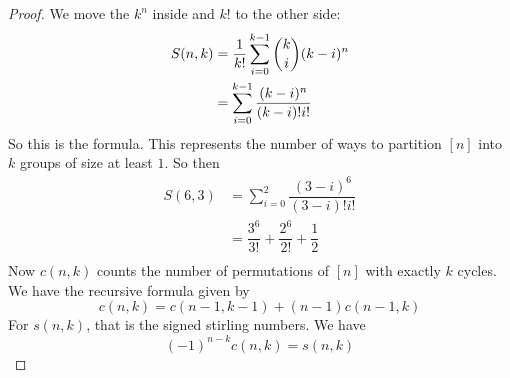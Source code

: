 \documentclass{article}
\begin{document}
\begin{proof}
        We move the $k^{n}$ inside and $k!$ to the other side:
            \begin{align*}
                S(n, k) &= \dfrac{1}{k!}\sum_{i = 0}^{k - 1}\dbinom{k}{i}(k - i)^{n} \\
                        &= \sum_{i = 0}^{k - 1}\dfrac{(k - i)^{n}}{(k - i)!i!}         
            \end{align*}
        So this is the formula. This represents the number of ways to partition $[n]$ into $k$ groups of size at least $1$. So then
            \begin{align*}
                S(6, 3) &= \sum_{i = 0}^{2}\dfrac{(3 - i)^{6}}{(3 - i)!i!} \\
                        &= \dfrac{3^{6}}{3!} + \dfrac{2^{6}}{2!} + \dfrac{1}{2} \\
            \end{align*}
        Now $c(n, k)$ counts the number of permutations of $[n]$ with exactly $k$ cycles. We have the recursive formula given by
            \begin{equation*}
                c(n, k) = c(n - 1, k - 1) + (n - 1)c(n - 1, k)
            \end{equation*}
        For $s(n, k)$, that is the signed stirling numbers. We have 
            \begin{equation*}
                (-1)^{n - k}c(n, k) = s(n, k)
            \end{equation*}
    \end{proof}
\end{document}
